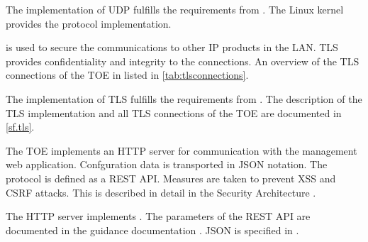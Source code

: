 The implementation of UDP fulfills the requirements from . The Linux
kernel provides the protocol implementation.





\lslantls{} is used to secure the communications to other IP products in the
LAN. TLS provides confidentiality and integrity to the connections. An overview
of the TLS connections of the TOE in listed in \autoref{tab:tlsconnections}.





The implementation of TLS fulfills the requirements from . The
description of the TLS implementation and all TLS connections of the TOE are
documented in \autoref{sf.tls}.





The TOE implements an HTTP server for communication with the management web
application. Confguration data is transported in JSON notation. The protocol is
defined as a REST API. Measures are taken to prevent XSS and CSRF attacks. This
is described in detail in the Security Architecture \autocite{adv_arc}.





The HTTP server implements . The parameters of the REST API are
documented in the guidance documentation \autocite{agd_adm}. JSON is specified
in .





